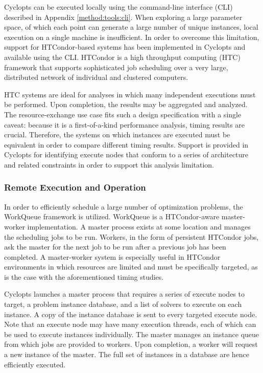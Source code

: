 Cyclopts can be executed locally using the  command-line
interface (CLI) described in Appendix \ref{method:tools:cli}. When exploring a
large parameter space, of which each point can generate a large number of unique
instances, local execution on a single machine is insufficient. In order to
overcome this limitation, support for HTCondor-based systems has been implemented
in Cyclopts and available using the  CLI. HTCondor
\cite{condor-practice} is a high throughput computing (HTC) framework that
supports sophisticated job scheduling over a very large, distributed network of
individual and clustered computers.

HTC systems are ideal for analyses in which many independent executions must be
performed. Upon completion, the results may be aggregated and analyzed. The
resource-exchange use case fits such a design specification with a single
caveat: because it is a first-of-a-kind performance analysis, timing results are
crucial. Therefore, the systems on which instances are executed must be
equivalent in order to compare different timing results. Support is provided in
Cyclopts for identifying execute nodes that conform to a series of architecture
and related constraints in order to support this analysis limitation.

\subsubsection{Remote Execution and Operation}

In order to efficiently schedule a large number of optimization problems, the
WorkQueue framework \cite{bui_work_2011} is utilized. WorkQueue is a
HTCondor-aware master-worker implementation. A master process exists at some
location and manages the scheduling jobs to be run. Workers, in the form of
persistent HTCondor jobs, ask the master for the next job to be run after a
previous job has been completed. A master-worker system is especially useful in
HTCondor environments in which resources are limited and must be specifically
targeted, as is the case with the aforementioned timing studies.

Cyclopts launches a master process that requires a series of execute nodes to
target, a problem instance database, and a list of solvers to execute on each
instance. A copy of the instance database is sent to every targeted execute
node. Note that an execute node may have many execution threads, each of which
can be used to execute instances individually. The master manages an instance
queue from which jobs are provided to workers. Upon completion, a worker will
request a new instance of the master. The full set of instances in a database
are hence efficiently executed.

